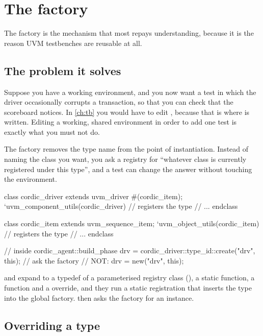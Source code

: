 \section{The factory}
\label{sec:uvm:factory}

%
The factory is the mechanism that most repays understanding, because it is
the reason UVM testbenches are reusable at all.

\subsection{The problem it solves}

Suppose you have a working environment, and you now want a test in which the
driver occasionally corrupts a transaction, so that you can check that the
scoreboard notices. In \cref{ch:tb} you would have to edit
, because that is where  is
written. Editing a working, shared environment in order to add one test is
exactly what you must not do.

The factory removes the type name from the point of instantiation. Instead of
naming the class you want, you ask a registry for ``whatever class is
currently registered under this type'', and a test can change the answer
without touching the environment.

\begin{uvmcode}[caption={Registration and creation},label={lst:uvm:factory-basics}]
class cordic_driver extends uvm_driver #(cordic_item);
  `uvm_component_utils(cordic_driver)      // registers the type
  // ...
endclass

class cordic_item extends uvm_sequence_item;
  `uvm_object_utils(cordic_item)           // registers the type
  // ...
endclass

// inside cordic_agent::build_phase
drv = cordic_driver::type_id::create("drv", this);   // ask the factory
// NOT:  drv = new("drv", this);
\end{uvmcode}

 and  expand to a
typedef of a parameterised registry class (), a static
 function, a  function and a
 override, and they run a static registration that
inserts the type into the global factory.  then asks
the factory for an instance.

\subsection{Overriding a type}

